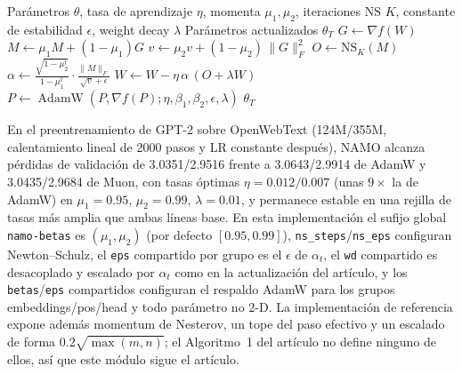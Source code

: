 \begin{algorithm}[H]
\caption{NAMO (Estimación Adaptativa de Momentos Basada en Normas con Momentum Ortogonalizado)}
\label{alg:namo-es}
\begin{algorithmic}[1]
\Require Parámetros $\theta$, tasa de aprendizaje $\eta$, momenta $\mu_1,\mu_2$, iteraciones NS $K$, constante de estabilidad $\epsilon$, weight decay $\lambda$
\Ensure Parámetros actualizados $\theta_T$
        \State $G \gets \nabla f(W)$ 
        \State $M \gets \mu_1 M + (1-\mu_1) G$ 
        \State $v \gets \mu_2 v + (1-\mu_2)\,\lVert G\rVert_F^2$ 
        \State $O \gets \mathrm{NS}_K(M)$ 
        \State $\alpha \gets \frac{\sqrt{1-\mu_2^t}}{1-\mu_1^t}\cdot\frac{\lVert M\rVert_F}{\sqrt{v}+\epsilon}$ 
        \State $W \gets W - \eta\,\alpha\,(O + \lambda W)$ 
    \Else
        \State $P \gets \operatorname{AdamW}(P, \nabla f(P); \eta, \beta_1, \beta_2, \epsilon, \lambda)$ 
    \EndIf
\EndFor
\Return $\theta_T$
\end{algorithmic}
\end{algorithm}

En el preentrenamiento de GPT-2 sobre OpenWebText (124M/355M, calentamiento lineal de
2000 pasos y LR constante después), NAMO alcanza pérdidas de validación de 3.0351/2.9516
frente a 3.0643/2.9914 de AdamW y 3.0435/2.9684 de Muon, con tasas óptimas
$\eta=0.012/0.007$ (unas $9\times$ la de AdamW) en $\mu_1=0.95$, $\mu_2=0.99$,
$\lambda=0.01$, y permanece estable en una rejilla de tasas más amplia que ambas líneas
base. En esta implementación el sufijo global \texttt{namo-betas} es $(\mu_1,\mu_2)$
(por defecto $[0.95,0.99]$), \texttt{ns\_steps}/\texttt{ns\_eps} configuran
Newton--Schulz, el \texttt{eps} compartido por grupo es el $\epsilon$ de $\alpha_t$, el
\texttt{wd} compartido es desacoplado y escalado por $\alpha_t$ como en la
actualización del artículo, y los \texttt{betas}/\texttt{eps} compartidos configuran el
respaldo AdamW para los grupos embeddings/pos/head y todo parámetro no 2-D. La
implementación de referencia expone además momentum de Nesterov, un tope del paso
efectivo y un escalado de forma $0.2\sqrt{\max(m,n)}$; el Algoritmo~1 del artículo no
define ninguno de ellos, así que este módulo sigue el artículo.


